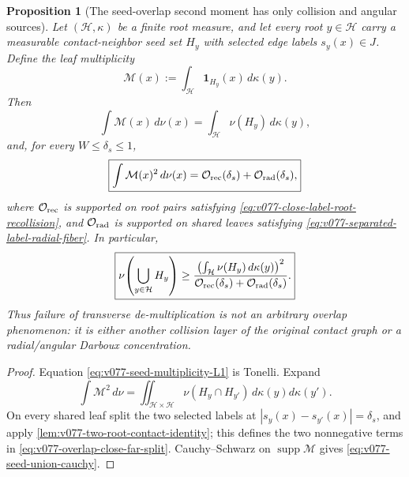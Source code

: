 \documentclass[10pt]{article}
\newtheorem{proposition}[theorem]{Proposition}
\newcommand{\supp}{\operatorname{supp}}
\begin{document}
\begin{proposition}[The seed-overlap second moment has only collision and angular sources]
\label{prop:v077-seed-overlap-routing}
Let \((\mathcal H,\kappa)\) be a finite root measure, and let every root \(y\in\mathcal H\) carry a
measurable contact-neighbor seed set \(H_y\) with selected edge labels \(s_y(x)\in J\).  Define the
leaf multiplicity
\[
\mathcal M(x)
:=
\int_{\mathcal H}\mathbf 1_{H_y}(x)\,d\kappa(y).
\]
Then
\begin{equation}
\label{eq:v077-seed-multiplicity-L1}
\int\mathcal M(x)\,d\nu(x)
=
\int_{\mathcal H}\nu(H_y)\,d\kappa(y),
\end{equation}
and, for every \(W\le\delta_s\le1\),
\begin{equation}
\label{eq:v077-overlap-close-far-split}
\boxed{
\int\mathcal M(x)^2\,d\nu(x)
=
\mathcal O_{\rm rec}(\delta_s)
+
\mathcal O_{\rm rad}(\delta_s),
}
\end{equation}
where \(\mathcal O_{\rm rec}\) is supported on root pairs satisfying
\eqref{eq:v077-close-label-root-recollision}, and \(\mathcal O_{\rm rad}\) is supported on shared
leaves satisfying \eqref{eq:v077-separated-label-radial-fiber}.
In particular,
\begin{equation}
\label{eq:v077-seed-union-cauchy}
\boxed{
\nu\!\left(\bigcup_{y\in\mathcal H}H_y\right)
\ge
\frac{\left(\int_{\mathcal H}\nu(H_y)\,d\kappa(y)\right)^2}
{\mathcal O_{\rm rec}(\delta_s)+\mathcal O_{\rm rad}(\delta_s)}.
}
\end{equation}
Thus failure of transverse de-multiplication is not an arbitrary overlap phenomenon: it is either
another collision layer of the original contact graph or a radial/angular Darboux concentration.
\end{proposition}

\begin{proof}
Equation \eqref{eq:v077-seed-multiplicity-L1} is Tonelli.  Expand
\[
\int\mathcal M^2\,d\nu
=
\iint_{\mathcal H\times\mathcal H}
\nu(H_y\cap H_{y'})\,d\kappa(y)d\kappa(y').
\]
On every shared leaf split the two selected labels at
\(|s_y(x)-s_{y'}(x)|=\delta_s\), and apply
\cref{lem:v077-two-root-contact-identity}; this defines the two nonnegative terms in
\eqref{eq:v077-overlap-close-far-split}.  Cauchy--Schwarz on
\(\supp\mathcal M\) gives \eqref{eq:v077-seed-union-cauchy}.
\end{proof}
\end{document}
